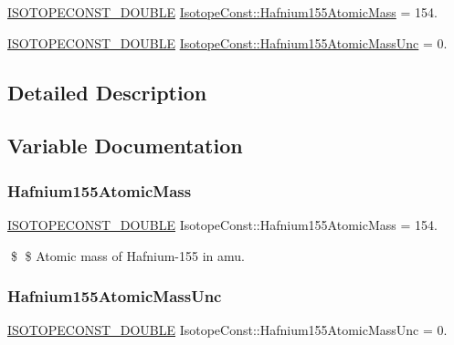 \begin{DoxyCompactItemize}
\item 
\mbox{\hyperlink{group___isotope_const-_macros_ga8f45a7272ce02c0b4c65c44636ed719a}{I\+S\+O\+T\+O\+P\+E\+C\+O\+N\+S\+T\+\_\+\+D\+O\+U\+B\+LE}} \mbox{\hyperlink{group___isotope_const-_hafnium-_hf155_gac80b4ccf7243e8f74cef23e207d794f0}{Isotope\+Const\+::\+Hafnium155\+Atomic\+Mass}} = 154.
\item 
\mbox{\hyperlink{group___isotope_const-_macros_ga8f45a7272ce02c0b4c65c44636ed719a}{I\+S\+O\+T\+O\+P\+E\+C\+O\+N\+S\+T\+\_\+\+D\+O\+U\+B\+LE}} \mbox{\hyperlink{group___isotope_const-_hafnium-_hf155_ga21075db97b859f751fa4a6d76e15ea0e}{Isotope\+Const\+::\+Hafnium155\+Atomic\+Mass\+Unc}} = 0.
\end{DoxyCompactItemize}


\subsection{Detailed Description}


\subsection{Variable Documentation}
\mbox{\label{group___isotope_const-_hafnium-_hf155_gac80b4ccf7243e8f74cef23e207d794f0}} 
\subsubsection{\texorpdfstring{Hafnium155\+Atomic\+Mass}{Hafnium155AtomicMass}}
{\footnotesize\ttfamily \mbox{\hyperlink{group___isotope_const-_macros_ga8f45a7272ce02c0b4c65c44636ed719a}{I\+S\+O\+T\+O\+P\+E\+C\+O\+N\+S\+T\+\_\+\+D\+O\+U\+B\+LE}} Isotope\+Const\+::\+Hafnium155\+Atomic\+Mass = 154.}

\$ \$ Atomic mass of Hafnium-\/155 in amu. \mbox{\label{group___isotope_const-_hafnium-_hf155_ga21075db97b859f751fa4a6d76e15ea0e}} 
\subsubsection{\texorpdfstring{Hafnium155\+Atomic\+Mass\+Unc}{Hafnium155AtomicMassUnc}}
{\footnotesize\ttfamily \mbox{\hyperlink{group___isotope_const-_macros_ga8f45a7272ce02c0b4c65c44636ed719a}{I\+S\+O\+T\+O\+P\+E\+C\+O\+N\+S\+T\+\_\+\+D\+O\+U\+B\+LE}} Isotope\+Const\+::\+Hafnium155\+Atomic\+Mass\+Unc = 0.}

